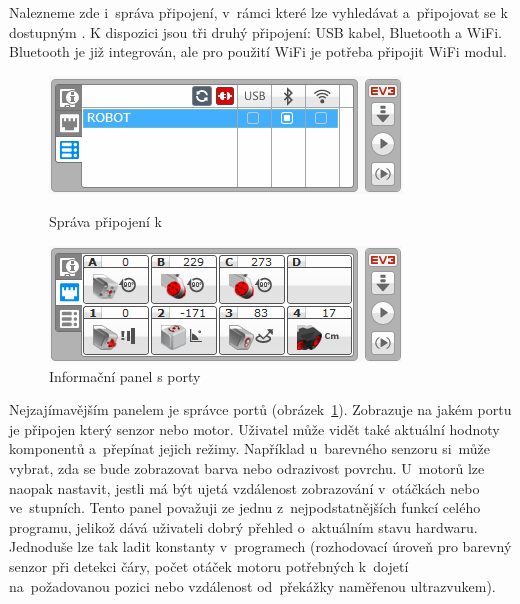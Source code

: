 Nalezneme zde i~správa připojení, v~rámci které lze vyhledávat a~připojovat se k dostupným . 
K dispozici jsou tři druhý připojení: USB kabel, Bluetooth a WiFi. Bluetooth je již integrován, ale pro použití WiFi je potřeba připojit WiFi modul.

\begin{figure}[h]
	\begin{minipage}[b]{.48\textwidth}
		\centering
		\includegraphics[width=\textwidth]{images/lego-soft_brick-manager_connected.png}
		\caption{Správa připojení k }
		\label{fig:lego-soft_brick-manager-connected}
	\end{minipage}
	\hfill
	\begin{minipage}[b]{.48\textwidth}
		\centering
		\includegraphics[width=\textwidth]{images/lego-soft_brick_port-view.png}
		\caption{Informační panel s porty}
		\label{fig:lego-soft_brick_port-view}
	\end{minipage}
\end{figure}

Nejzajímavějším panelem je správce portů (obrázek~\ref{fig:lego-soft_brick_port-view}). 
Zobrazuje na jakém portu je připojen který senzor nebo motor. 
Uživatel může vidět také aktuální hodnoty komponentů a~přepínat jejich režimy.    
Například u~barevného senzoru si~může vybrat, zda se bude zobrazovat barva nebo odrazivost povrchu. U~motorů lze naopak nastavit, jestli má být ujetá vzdálenost zobrazování v~otáčkách nebo ve~stupních. 
Tento panel považuji ze jednu z~nejpodstatnějších funkcí celého programu, jelikož dává uživateli dobrý přehled o~aktuálním stavu hardwaru. 
Jednoduše lze tak ladit konstanty v~programech (rozhodovací úroveň pro barevný senzor při detekci čáry, počet otáček motoru potřebných k~dojetí na~požadovanou pozici nebo vzdálenost od~překážky naměřenou ultrazvukem). 

